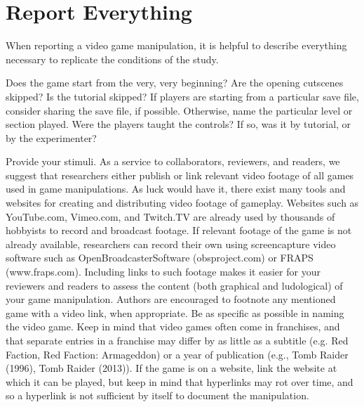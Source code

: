 \section{Report Everything}
When reporting a video game manipulation, it is helpful to describe everything necessary to replicate the conditions of the study. 

Does the game start from the very, very beginning? Are the opening cutscenes skipped? Is the tutorial skipped?
If players are starting from a particular save file, consider sharing the save file, if possible. Otherwise, name the particular level or section played.
Were the players taught the controls? If so, was it by tutorial, or by the experimenter? 

Provide your stimuli. As a service to collaborators, reviewers, and readers, we suggest that researchers either publish or link relevant video footage of all games used in game manipulations. As luck would have it, there exist many tools and websites for creating and distributing video footage of gameplay. Websites such as YouTube.com, Vimeo.com, and Twitch.TV are already used by thousands of hobbyists to record and broadcast footage. If relevant footage of the game is not already available, researchers can record their own using screencapture video software such as OpenBroadcasterSoftware (obsproject.com) or FRAPS (www.fraps.com). Including links to such footage makes it easier for your reviewers and readers to assess the content (both graphical and ludological) of your game manipulation. Authors are encouraged to footnote any mentioned game with a video link, when appropriate. 
Be as specific as possible in naming the video game. Keep in mind that video games often come in franchises, and that separate entries in a franchise may differ by as little as a subtitle (e.g. Red Faction, Red Faction: Armageddon) or a year of publication (e.g., Tomb Raider (1996), Tomb Raider (2013)). If the game is on a website, link the website at which it can be played, but keep in mind that hyperlinks may rot over time, and so a hyperlink is not sufficient by itself to document the manipulation.

